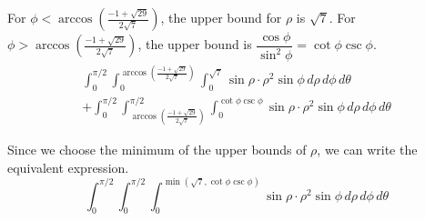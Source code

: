 \documentclass[a4paper, 12pt]{article}
\renewcommand{\headrulewidth}{0pt}
\renewcommand{\headrulewidth}{0pt}
\begin{document}
\begin{enumerate}[leftmargin=*,label=\textbf{\arabic*.}]
For $\phi<\arccos\left(\frac{-1+\sqrt{29}}{2\sqrt7}\right)$, the upper bound for $\rho$ is $\sqrt7$. For $\phi>\arccos\left(\frac{-1+\sqrt{29}}{2\sqrt7}\right)$, the upper bound is $\dfrac{\cos\phi}{\sin^2\phi}=\cot\phi\csc\phi$.
\[\boxed{\begin{array}{l}\displaystyle\int_0^{\pi/2}\int_0^{\arccos\left(\textstyle\frac{-1+\sqrt{29}}{2\sqrt7}\right)}\int_0^{\sqrt7}\sin\rho \cdot\rho^2\sin\phi\,d\rho\,d\phi\,d\theta\\[1em]\displaystyle+\int_0^{\pi/2}\int_{\arccos\left(\textstyle\frac{-1+\sqrt{29}}{2\sqrt7}\right)}^{\pi/2}\int_0^{\cot\phi\csc\phi}\sin\rho\cdot\rho^2\sin\phi\,d\rho\,d\phi\,d\theta\end{array}}\]

Since we choose the minimum of the upper bounds of $\rho$, we can write the equivalent expression.
\[\boxed{\int_0^{\pi/2}\int_0^{\pi/2}\int_0^{\min\left(\sqrt7,\cot\phi\csc\phi\right)}\sin\rho\cdot\rho^2\sin\phi\,d\rho\,d\phi\,d\theta}\]

\end{enumerate}

\newpage
\pagestyle{fancy}
\renewcommand{\headrulewidth}{1pt}

\end{document}
